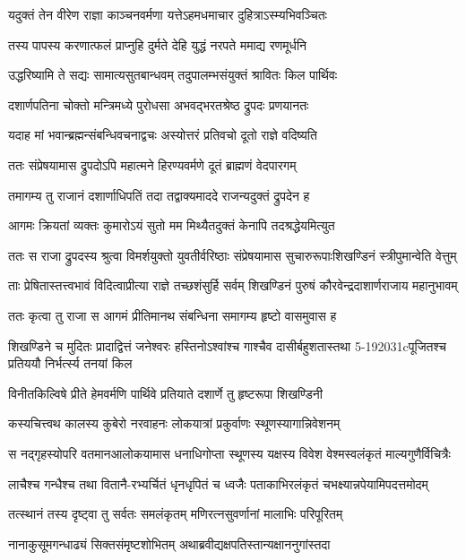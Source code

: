 \twolineshloka
{यदुक्तं तेन वीरेण राज्ञा काञ्चनवर्मणा}
{यत्तेऽहमधमाचार दुहित्राऽस्म्यभिवञ्चितः}


\twolineshloka
{तस्य पापस्य करणात्फलं प्राप्नुहि दुर्मते}
{देहि युद्धं नरपते ममाद्य रणमूर्धनि}


\twolineshloka
{उद्धरिष्यामि ते सद्यः सामात्यसुतबान्धवम्}
{तदुपालम्भसंयुक्तं श्रावितः किल पार्थिवः}


\twolineshloka
{दशार्णपतिना चोक्तो मन्त्रिमध्ये पुरोधसा}
{अभवद्भरतश्रेष्ठ द्रुपदः प्रणयानतः}


\twolineshloka
{यदाह मां भवान्ब्रह्मन्संबन्धिवचनाद्वचः}
{अस्योत्तरं प्रतिवचो दूतो राज्ञे वदिष्यति}


\twolineshloka
{ततः संप्रेषयामास द्रुपदोऽपि महात्मने}
{हिरण्यवर्मणे दूतं ब्राह्मणं वेदपारगम्}


\twolineshloka
{तमागम्य तु राजानं दशार्णाधिपतिं तदा}
{तद्वाक्यमाददे राजन्यदुक्तं द्रुपदेन ह}


\twolineshloka
{आगमः क्रियतां व्यक्तः कुमारोऽयं सुतो मम}
{मिथ्यैतदुक्तं केनापि तदश्रद्धेयमित्युत}


\threelineshloka
{ततः स राजा द्रुपदस्य श्रुत्वा}
{विमर्शयुक्तो युवतीर्वरिष्ठाः}
{संप्रेषयामास सुचारुरूपाःशिखण्डिनं स्त्रीपुमान्वेति वेत्तुम्}


\twolineshloka
{ताः प्रेषितास्तत्त्वभावं विदित्वाप्रीत्या राज्ञे तच्छशंसुर्हि सर्वम्}
{शिखण्डिनं पुरुषं कौरवेन्द्रदाशार्णराजाय महानुभावम्}


\twolineshloka
{ततः कृत्वा तु राजा स आगमं प्रीतिमानथ}
{संबन्धिना समागम्य हृष्टो वासमुवास ह}


\threelineshloka
{शिखण्डिने च मुदितः प्रादाद्वित्तं जनेश्वरः}
{हस्तिनोऽश्वांश्च गाश्चैव दासीर्बहुशतास्तथा}
{5-192031cपूजितश्च प्रतिययौ निर्भर्त्स्य तनयां किल}


\twolineshloka
{विनीतकिल्विषे प्रीते हेमवर्मणि पार्थिवे}
{प्रतियाते दशार्णे तु हृष्टरूपा शिखण्डिनी}


\twolineshloka
{कस्यचित्त्वथ कालस्य कुबेरो नरवाहनः}
{लोकयात्रां प्रकुर्वाणः स्थूणस्यागान्निवेशनम्}


\twolineshloka
{स नद्गृहस्योपरि वतमानआलोकयामास धनाधिगोप्ता}
{स्थूणस्य यक्षस्य विवेश वेश्मस्वलंकृतं माल्यगुणैर्विचित्रैः}


\twolineshloka
{लाचैश्च गन्धैश्च तथा वितानै-रभ्यर्चितं धृनधृपितं च}
{ध्वजैः पताकाभिरलंकृतं चभक्ष्यान्नपेयामिपदत्तमोदम्}


\twolineshloka
{तत्स्थानं तस्य दृष्ट्वा तु सर्वतः समलंकृतम्}
{मणिरत्नसुवर्णानां मालाभिः परिपूरितम्}


\twolineshloka
{नानाकुसूमगन्धाढ्यं सिक्तसंमृष्टशोभितम्}
{अथाब्रवीद्यक्षपतिस्तान्यक्षाननुगांस्तदा}


